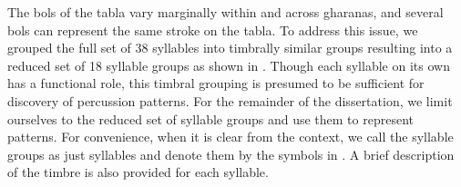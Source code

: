 The \glspl{bol} of the \gls{tabla} vary marginally within and across \glspl{gharana}, and several \glspl{bol} can represent the same stroke on the \gls{tabla}. To address this issue, we grouped the full set of 38 syllables into timbrally similar groups resulting into a reduced set of 18 syllable groups as shown in . Though each syllable on its own has a functional role, this timbral grouping is presumed to be sufficient for discovery of percussion patterns. For the remainder of the dissertation, we limit ourselves to the reduced set of syllable groups and use them to represent patterns. For convenience, when it is clear from the context, we call the syllable groups as just syllables and denote them by the symbols in . A brief description of the timbre is also provided for each syllable. 
\begin{table}
  \centering
{}\\
%
\\
%
\end{table}
